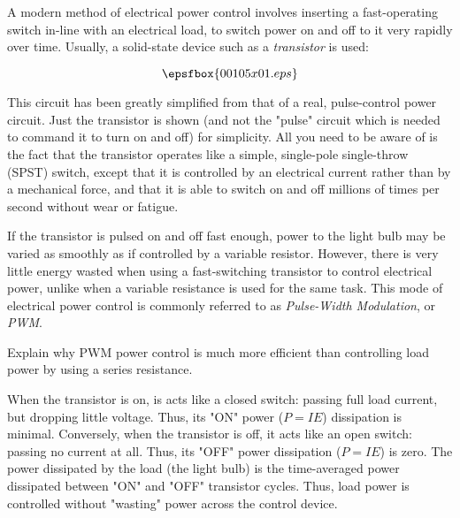 

A modern method of electrical power control involves inserting a fast-operating switch in-line with an electrical load, to switch power on and off to it very rapidly over time.  Usually, a solid-state device such as a {\it transistor} is used:

$$\epsfbox{00105x01.eps}$$

This circuit has been greatly simplified from that of a real, pulse-control power circuit.  Just the transistor is shown (and not the "pulse" circuit which is needed to command it to turn on and off) for simplicity.  All you need to be aware of is the fact that the transistor operates like a simple, single-pole single-throw (SPST) switch, except that it is controlled by an electrical current rather than by a mechanical force, and that it is able to switch on and off millions of times per second without wear or fatigue.

If the transistor is pulsed on and off fast enough, power to the light bulb may be varied as smoothly as if controlled by a variable resistor.  However, there is very little energy wasted when using a fast-switching transistor to control electrical power, unlike when a variable resistance is used for the same task.  This mode of electrical power control is commonly referred to as {\it Pulse-Width Modulation}, or {\it PWM}.  

Explain why PWM power control is much more efficient than controlling load power by using a series resistance.







When the transistor is on, is acts like a closed switch: passing full load current, but dropping little voltage.  Thus, its "ON" power ($P = I E$) dissipation is minimal.  Conversely, when the transistor is off, it acts like an open switch: passing no current at all.  Thus, its "OFF" power dissipation ($P = I E$) is zero.  The power dissipated by the load (the light bulb) is the time-averaged power dissipated between "ON" and "OFF" transistor cycles.  Thus, load power is controlled without "wasting" power across the control device.

